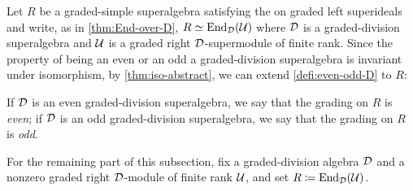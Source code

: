
Let $R$ be a graded-simple superalgebra satisfying the \dcc on graded left superideals and write, as in \cref{thm:End-over-D}, $R\simeq \operatorname{End}_{\mathcal{D}} (\mathcal U)$ where $\mathcal{D}$ is a graded-division superalgebra and $\mathcal U$ is a graded right $\mathcal{D}$-supermodule of finite rank. 
Since the property of being an even or an odd a graded-division superalgebra is invariant under isomorphism, by \cref{thm:iso-abstract}, we can extend \cref{defi:even-odd-D} to $R$:

\begin{defi}\label{defi:even-odd-R}
    If $\mathcal{D}$ is an even graded-division superalgebra, we say that the grading on $R$ is \emph{even}; if $\mathcal{D}$ is an odd graded-division superalgebra, we say that the grading on $R$ is \emph{odd}. 
\end{defi}

For the remaining part of this subsection, fix a graded-division algebra $\mathcal{D}$ and a nonzero graded right $\mathcal{D}$-module of finite rank $\mathcal U$, and set $R \coloneqq \operatorname{End}_{\mathcal{D}} (\mathcal U)$. 

